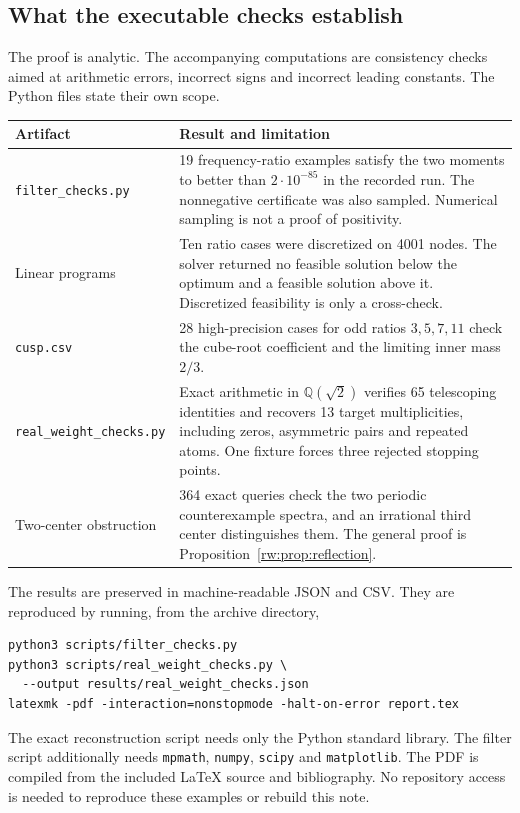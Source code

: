 \subsection{What the executable checks establish}

The proof is analytic. The accompanying computations are consistency
checks aimed at arithmetic errors, incorrect signs and incorrect leading
constants. The Python files state their own scope.

\begin{center}
\small
\begin{tabular}{@{}p{.27\linewidth}p{.63\linewidth}@{}}
\toprule
Artifact & Result and limitation\\
\midrule
\texttt{filter\_checks.py} & 19 frequency-ratio examples satisfy the two
moments to better than $2\cdot10^{-85}$ in the recorded run. The
nonnegative certificate was also sampled. Numerical sampling is not
a proof of positivity.\\[4pt]
Linear programs & Ten ratio cases were discretized on
4001 nodes. The solver returned no feasible solution below the optimum
and a feasible solution above it. Discretized feasibility is only a
cross-check.\\[4pt]
\texttt{cusp.csv} & 28 high-precision cases for odd ratios
$3,5,7,11$ check the cube-root coefficient and the limiting inner mass
$2/3$.\\[4pt]
\texttt{real\_weight\_checks.py} & Exact arithmetic in
$\mathbb Q(\sqrt2)$ verifies 65 telescoping identities and recovers
13 target multiplicities, including zeros, asymmetric pairs and repeated
atoms. One fixture forces three rejected stopping points.\\[4pt]
Two-center obstruction & 364 exact queries check the two periodic
counterexample spectra, and an irrational third center distinguishes
them. The general proof is Proposition~\ref{rw:prop:reflection}.\\
\bottomrule
\end{tabular}
\end{center}

The results are preserved in machine-readable JSON and CSV. They are
reproduced by running, from the archive directory,
\begin{verbatim}
python3 scripts/filter_checks.py
python3 scripts/real_weight_checks.py \
  --output results/real_weight_checks.json
latexmk -pdf -interaction=nonstopmode -halt-on-error report.tex
\end{verbatim}
The exact reconstruction script needs only the Python standard library.
The filter script additionally needs \texttt{mpmath}, \texttt{numpy},
\texttt{scipy} and \texttt{matplotlib}. The PDF is compiled from the
included LaTeX source and bibliography. No repository access is needed
to reproduce these examples or rebuild this note.

